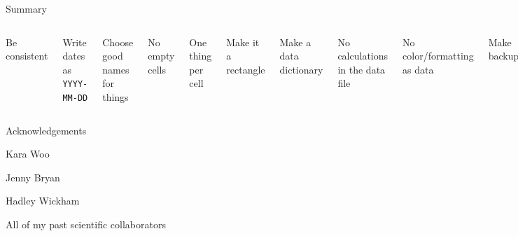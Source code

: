 \documentclass[aspectratio=169,12pt,t]{beamer}
\begin{document}
\begin{frame}{Summary}

  \begin{columns}


    \bbe
  \item Be consistent
  \item Write dates as {\tt YYYY-MM-DD}
  \item Choose good names for things
  \item No empty cells
  \item One thing per cell
  \item Make it a rectangle
    \ee


    \bbe
    \addtocounter{enumi}{6}
  \item Make a data dictionary
  \item No calculations in the data file
  \item No color/formatting as data
  \item Make backups
  \item Use data validation
  \item Save as plain text
    \ee

    \end{columns}



\end{frame}




\begin{frame}{Acknowledgements}


  \bbi
\item[] Kara Woo
\item[] Jenny Bryan
\item[] Hadley Wickham
\item[] All of my past scientific collaborators
  \ei


\end{frame}
\end{document}
